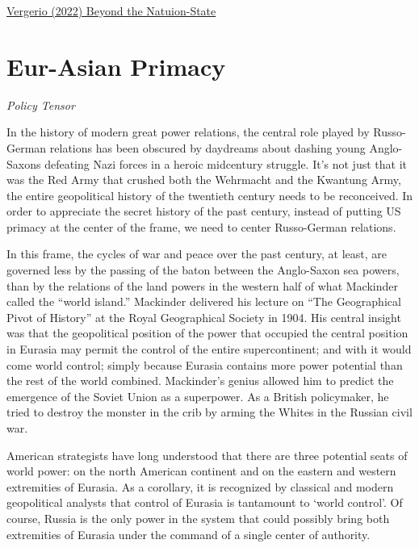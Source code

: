 \documentclass[
]{book}
\begin{document}
\href{https://www.bostonreview.net/articles/beyond-the-nation-state/}{Vergerio (2022) Beyond the Natuion-State}

\hypertarget{eur-asian-primacy}{%
\section{Eur-Asian Primacy}\label{eur-asian-primacy}}

\emph{Policy Tensor}

In the history of modern great power relations, the central role played by Russo-German relations has been obscured by daydreams about dashing young Anglo-Saxons defeating Nazi forces in a heroic midcentury struggle. It's not just that it was the Red Army that crushed both the Wehrmacht and the Kwantung Army, the entire geopolitical history of the twentieth century needs to be reconceived. In order to appreciate the secret history of the past century, instead of putting US primacy at the center of the frame, we need to center Russo-German relations.

In this frame, the cycles of war and peace over the past century, at least, are governed less by the passing of the baton between the Anglo-Saxon sea powers, than by the relations of the land powers in the western half of what Mackinder called the ``world island.'' Mackinder delivered his lecture on ``The Geographical Pivot of History'' at the Royal Geographical Society in 1904. His central insight was that the geopolitical position of the power that occupied the central position in Eurasia may permit the control of the entire supercontinent; and with it would come world control; simply because Eurasia contains more power potential than the rest of the world combined. Mackinder's genius allowed him to predict the emergence of the Soviet Union as a superpower. As a British policymaker, he tried to destroy the monster in the crib by arming the Whites in the Russian civil war.

American strategists have long understood that there are three potential seats of world power: on the north American continent and on the eastern and western extremities of Eurasia. As a corollary, it is recognized by classical and modern geopolitical analysts that control of Eurasia is tantamount to `world control'. Of course, Russia is the only power in the system that could possibly bring both extremities of Eurasia under the command of a single center of authority.
\end{document}
